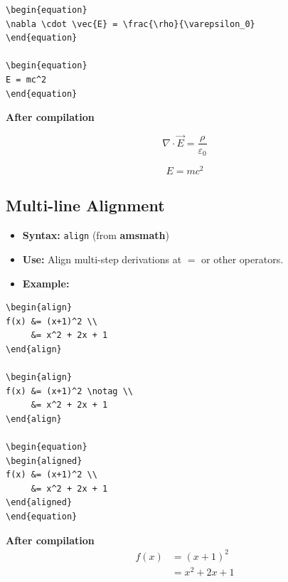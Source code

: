 \documentclass[12pt,a4paper]{article}
\begin{document}
\begin{verbatim}
\begin{equation}
\nabla \cdot \vec{E} = \frac{\rho}{\varepsilon_0}
\end{equation}

\begin{equation}
E = mc^2
\end{equation}
\end{verbatim}

\textbf{After compilation}

\begin{equation}
\nabla \cdot \vec{E} = \frac{\rho}{\varepsilon_0}
\end{equation}

\begin{equation}
E = mc^2
\end{equation}

\subsection{Multi-line Alignment}

\begin{itemize}
    \item \textbf{Syntax:} \texttt{align} (from \textbf{amsmath})
    \item \textbf{Use:} Align multi-step derivations at $=$ or other operators.
    \item \textbf{Example:}
\end{itemize}

\begin{verbatim}
\begin{align}
f(x) &= (x+1)^2 \\
     &= x^2 + 2x + 1
\end{align}

\begin{align}
f(x) &= (x+1)^2 \notag \\
     &= x^2 + 2x + 1
\end{align}

\begin{equation}
\begin{aligned}
f(x) &= (x+1)^2 \\
     &= x^2 + 2x + 1
\end{aligned}
\end{equation}
\end{verbatim}

\textbf{After compilation}
\begin{align}
f(x) &= (x+1)^2 \\
     &= x^2 + 2x + 1
\end{align}
\end{document}
